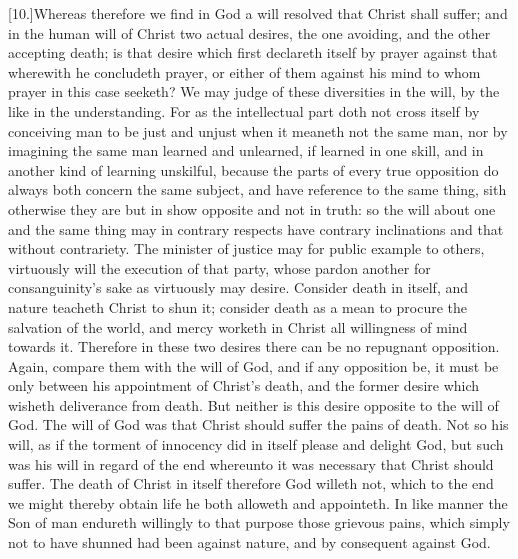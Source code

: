 [10.]Whereas therefore we find in God a will resolved that Christ shall suffer; and in the human will of Christ two actual desires, the one avoiding, and the other accepting death; is that desire which first declareth itself by prayer against that wherewith he concludeth prayer, or either of them against his mind to whom prayer in this case seeketh? We may judge of these diversities in the will, by the like in the understanding. For as the intellectual part doth not cross itself by conceiving man to be just and unjust when it meaneth not the same man, nor by imagining the same man learned and unlearned, if learned in one skill, and in another kind  of learning unskilful, because the parts of every true opposition do always both concern the same subject,
 and have reference to the same thing, sith otherwise they are but in show opposite and not in truth: so the will about one and the same thing may in contrary respects have contrary inclinations and that without contrariety. The minister of justice may for public example to others, virtuously will the execution of that party, whose pardon another for consanguinity’s sake as virtuously may desire. Consider death in itself, and nature teacheth Christ to shun it; consider death as a mean to procure the salvation of the world, and mercy worketh in Christ all willingness of mind towards it. Therefore in these two desires there can be no repugnant opposition. Again, compare them with the will of God, and if any opposition be, it must be only between his appointment of Christ’s death, and the former desire which wisheth deliverance from death. But neither is this desire opposite to the will of God. The will of God was that Christ should suffer the pains of death. Not so his will, as if the torment of innocency did in itself please and delight God, but such was his will in regard of the end whereunto it was necessary that Christ should suffer. The death of Christ in itself therefore God willeth not, which to the end we might thereby obtain life he both alloweth and appointeth. In like manner the Son of man endureth willingly to that purpose those grievous pains, which simply not to have shunned had been against nature, and by consequent against God.

